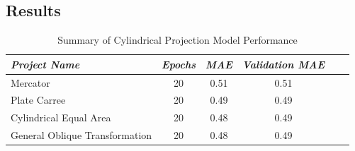 \subsection{Results}
\begin{table}[ht]
    \centering
    \caption{Summary of Cylindrical Projection Model Performance}
    \label{cylindrical_results_table}
    \renewcommand{\arraystretch}{1.2} %
    \begin{tabular}{|l|c|c|c|c|c|}
        \hline
        \rowcolor[gray]{0.9}
        \textbf{\emph{Project Name}}   & \textbf{\emph{Epochs}} & \textbf{\emph{MAE}} & \textbf{\emph{Validation MAE}} \\ \hline
        Mercator                       & 20                     & 0.51                & 0.51                           \\ \hline
        Plate Carree                   & 20                     & 0.49                & 0.49                           \\ \hline
        Cylindrical Equal Area         & 20                     & 0.48                & 0.49                           \\ \hline
        General Oblique Transformation & 20                     & 0.48                & 0.49                           \\ \hline
    \end{tabular}


\end{table}